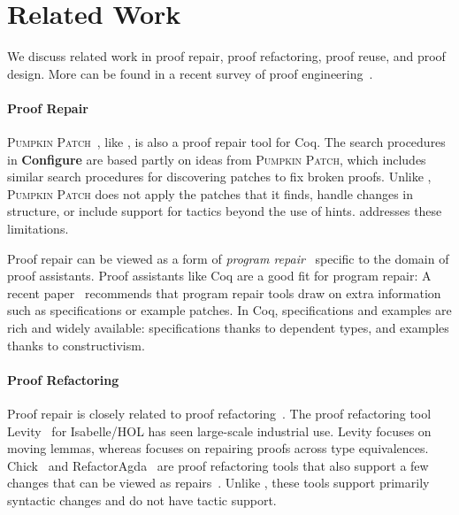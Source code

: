 \section{Related Work}
\label{sec:related}


We discuss related work in proof repair, proof refactoring, proof reuse, and proof design.
More can be found in a recent survey of proof engineering~\cite{PGL-045}.

\paragraph{Proof Repair}

\textsc{Pumpkin Patch}~\cite{pumpkinpatch}, like \toolname, is also a proof repair tool for Coq.
The search procedures in \textbf{Configure} are based partly on ideas from \textsc{Pumpkin Patch}, which includes
similar search procedures for discovering patches to fix broken proofs.
Unlike \toolname, \textsc{Pumpkin Patch} does not apply the patches that it finds,
handle changes in structure, or include support for tactics beyond the use of hints.
\toolname addresses these limitations.

Proof repair can be viewed as a form of \textit{program repair}~\cite{Monperrus:2018:ASR:3177787.3105906, Gazzola:2018:ASR:3180155.3182526}
specific to the domain of proof assistants.
Proof assistants like Coq are a good fit for program repair: A recent paper~\cite{Qi:2015:APP:2771783.2771791} 
recommends that program repair tools draw on extra information
such as specifications or example patches. In Coq, specifications and examples 
are rich and widely available: specifications thanks to dependent types,
and examples thanks to constructivism.

\paragraph{Proof Refactoring}

Proof repair is closely related to proof refactoring~\cite{WhitesidePhD}. 
The proof refactoring tool Levity~\cite{Bourke12} for Isabelle/HOL has seen large-scale industrial use.
Levity focuses on moving lemmas,
whereas \toolname focuses on repairing proofs across type equivalences.
Chick~\cite{robert2018} and RefactorAgda~\cite{wibergh2019} are proof refactoring tools that
also support a few changes that can be viewed as repairs~\cite{PGL-045}.
Unlike \toolname, these tools support primarily syntactic changes and do not have tactic support.

